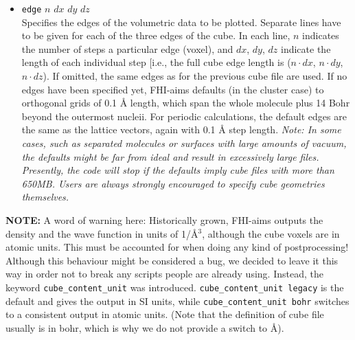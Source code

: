 \begin{itemize}
\item {} \texttt{edge} $n$ $dx$ $dy$ $dz$ \\
Specifies the edges of the volumetric data to be plotted. Separate
lines have to be given for each of the three edges of the cube. In
each line, $n$ indicates the number of steps a particular edge
(voxel), and $dx$, $dy$, $dz$ indicate the length of each individual
step [i.e., the full cube edge length is ($n\cdot dx$, $n\cdot dy$,
  $n\cdot dz$). If omitted, the same edges as for the previous cube
  file are used. If no edges have been specified yet, FHI-aims
  defaults (in the cluster case) to orthogonal grids of 0.1 {\AA}
  length, which span the whole molecule plus 14 Bohr beyond the
  outermost nucleii. For periodic calculations, the default edges
  are the same as the lattice vectors, again with 0.1 {\AA} step
  length. \emph{Note: In some cases, such as separated molecules or
    surfaces with large amounts of vacuum, the defaults might be far
    from ideal and result in excessively large files.  Presently, the
    code will stop if the defaults imply cube files with more than
    650MB. Users are \emph{always} strongly encouraged to specify
    cube geometries themselves. }
\end{itemize}

\textbf{NOTE:} A word of warning here: Historically grown, FHI-aims outputs the density and the wave function
in units of 1/\AA$^3$, although the cube voxels are in atomic units. This must be accounted for
when doing any kind of postprocessing! Although this behaviour might be considered a bug, we
decided to leave it this way in order not to break any scripts people are already using.
Instead, the keyword \texttt{cube\_content\_unit} was introduced. \newline
\texttt{cube\_content\_unit legacy} is the default and gives the output in SI units, while \newline
\texttt{cube\_content\_unit bohr} switches to a consistent output in atomic units.
(Note that the definition of cube file usually is in bohr, which is why we do not provide
a switch to \AA).

